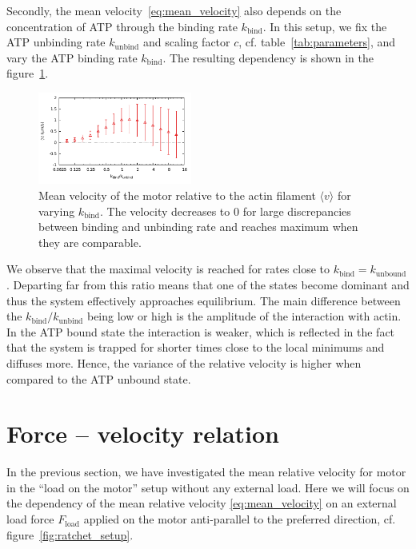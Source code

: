 \documentclass[aps,pre,twocolumn,showpacs,showkeys,superscriptaddress,floatfix]{revtex4-1}
\begin{document}
Secondly, the mean velocity~\eqref{eq:mean_velocity} also depends on the concentration of ATP through the binding rate $k_\text{bind}$. 
In this setup, we fix the ATP unbinding rate $k_\text{unbind}$ and scaling factor $c$, cf. table~\ref{tab:parameters}, and vary the ATP binding rate $k_\text{bind}$. 
The resulting dependency is shown in the figure~\ref{fig:v_k}. 
\begin{figure}[t]
\centering
\includegraphics[width=0.45\textwidth,height=!]{v_k}
\caption{
\label{fig:v_k} 
Mean velocity of the motor relative to the actin filament $\langle v \rangle$ for varying $k_\text{bind}$.
The velocity decreases to $0$ for large discrepancies between binding and unbinding rate and reaches maximum when they are comparable.
}
\end{figure}
We observe that the maximal velocity is reached for rates close to $k_\text{bind} = k_\text{unbound}$. 
Departing far from this ratio means that one of the states become dominant and thus the system effectively approaches equilibrium.  
The main difference between the $k_\text{bind}/k_\text{unbind}$ being low or high is the amplitude of the interaction with actin. 
In the ATP bound state the interaction is weaker, 
which is reflected in the fact that the system is trapped for shorter times close to the local minimums and diffuses more. 
Hence, the variance of the relative velocity is higher when compared to the ATP unbound state. 


\section{Force -- velocity relation}
\label{sec:force-velocity}
In the previous section, we have investigated the mean relative velocity for motor in the ``load on the motor'' setup without any external load. 
Here we will focus on the dependency of the mean relative velocity \eqref{eq:mean_velocity} on an external load force $F_\text{load}$ applied on the motor anti-parallel to the preferred direction, 
cf. figure~\ref{fig:ratchet_setup}.
\end{document}
